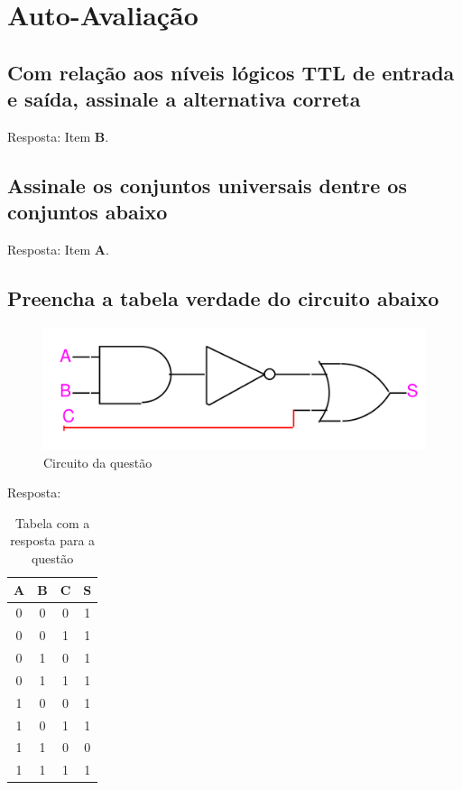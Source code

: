 \documentclass[12pt]{article}
\begin{document}
\nocite{*}



\newpage 
\section*{Auto-Avaliação}

\subsection{Com relação aos níveis lógicos TTL de entrada e saída, assinale a
  alternativa correta}
Resposta: Item \textbf{B}.

\subsection{Assinale os conjuntos universais dentre os conjuntos abaixo}
Resposta: Item \textbf{A}.

\subsection{Preencha a tabela verdade do circuito abaixo}
\begin{figure}[H]
    \centering
    \includegraphics[width=.9\textwidth]{exp1_4.3_f1.png}
    \caption{Circuito da questão}
    \label{fig:exp1_4.3_f1}
\end{figure}

Resposta:

\begin{table}[H]
    \centering
    \caption{Tabela com a resposta para a questão}
    \begin{tabular}{|c|c|c|c|} \hline
    \textbf{A} & \textbf{B} & \textbf{C} & \textbf{S} \\ \hline
    0 & 0 & 0 & 1 \\ \hline
    0 & 0 & 1 & 1 \\ \hline
    0 & 1 & 0 & 1 \\ \hline
    0 & 1 & 1 & 1 \\ \hline
    1 & 0 & 0 & 1 \\ \hline
    1 & 0 & 1 & 1 \\ \hline
    1 & 1 & 0 & 0 \\ \hline
    1 & 1 & 1 & 1 \\ \hline
    \end{tabular}
    \label{tab:tabela_verdade}
\end{table}
\end{document}
